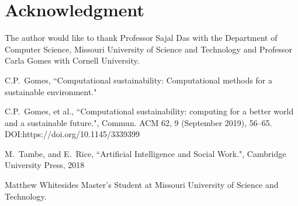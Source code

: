 \documentclass[journal,onecolumn]{IEEEtran}
\begin{document}
\section*{Acknowledgment}
The author would like to thank Professor Sajal Das with the Department of Computer Science, Missouri University of Science and Technology and Professor Carla Gomes with Cornell University.

\ifCLASSOPTIONcaptionsoff
  \newpage
\fi

\begin{thebibliography}{1}

C.P.~Gomes, ``Computational sustainability: Computational methods for a sustainable environment."

C.P.~Gomes, et al., ``Computational sustainability: computing for a better world and a sustainable future.", Commun. ACM 62, 9 (September 2019), 56–65. DOI:https://doi.org/10.1145/3339399

M.~Tambe, and E.~Rice, ``Artificial Intelligence and Social Work.", Cambridge University Press, 2018

\end{thebibliography}

\begin{IEEEbiographynophoto}{Matthew Whitesides}
  Master's Student at Missouri University of Science and Technology.
\end{IEEEbiographynophoto}

\end{document}
